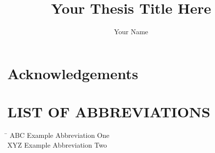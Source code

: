 \documentclass[11pt,masters]{unc_dissertation}
\title{Your Thesis Title Here}
\author{Your Name}
\begin{document}

\pagestyle{plain}


\frontmatter

\maketitle

\chapter*{Acknowledgements}


\newlength{\oldbaselineskip}
\setlength{\oldbaselineskip}{\the\baselineskip}
\newlength{\oldparskip}
\setlength{\oldparskip}{\the\parskip}

\setlength{\baselineskip}{0.5\oldbaselineskip}
\setlength{\parskip}{0.5\oldbaselineskip}

\tableofcontents

\listoffigures

\listoftables

\setlength{\baselineskip}{1.0\oldbaselineskip}
\setlength{\parskip}{1.0\oldparskip}

\makeatletter
\my@isalisttrue
\chapter*{LIST OF ABBREVIATIONS}
\my@isalistfalse
\makeatother
{\singlespacing\vspace{-5pt}
\begin{tabbing}
\hspace{1.5in}\=\kill
ABC \> Example Abbreviation One \\[0.5\baselineskip]
XYZ \> Example Abbreviation Two \\[0.5\baselineskip]
\end{tabbing}
}

\mainmatter

\end{document}
